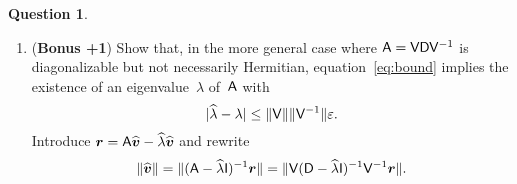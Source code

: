 \documentclass[11pt]{article}
\theoremstyle{definition}
\newtheorem{question}{Question}
\theoremstyle{remark}
\begin{document}
\begin{question}
\begin{enumerate}
        \item
            (\textbf{Bonus +1}) Show that, in the more general case where $\mathsf A = \mathsf V \mathsf D \mathsf V^{-1}$ is diagonalizable but not necessarily Hermitian,
            equation~\eqref{eq:bound} implies the existence of an eigenvalue~$\lambda$ of~$\mathsf A$ with
            \[
                \lvert\widehat \lambda - \lambda\rvert \leq \lVert\mathsf V\rVert \lVert\mathsf V^{-1}\rVert \varepsilon.
            \]
            Introduce $\mathbf{\boldsymbol{r}} = \mathsf A \widehat{\mathbf{\boldsymbol{v}}} - \widehat{\lambda} \widehat{\mathbf{\boldsymbol{v}}}$ and rewrite
            \[
                \lVert\widehat {\mathbf{\boldsymbol{v}}}\rVert = \lVert(\mathsf A - \widehat \lambda \mathsf I)^{-1}  {\mathbf{\boldsymbol{r}}}\rVert
                = \lVert\mathsf V (\mathsf D - \widehat \lambda \mathsf I)^{-1}  \mathsf V^{-1} {\mathbf{\boldsymbol{r}}}\rVert.
            \]
    \end{enumerate}
\end{question}
\end{document}
